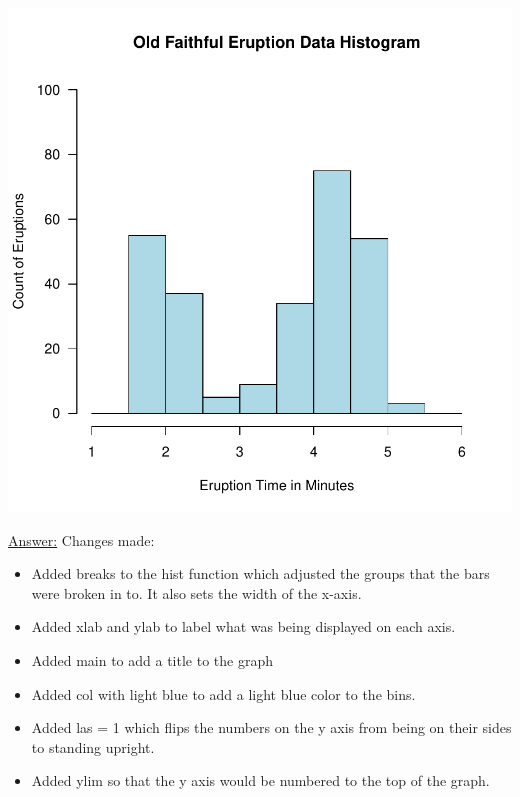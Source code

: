 \documentclass[12pt,letterpaper,final]{article}
\begin{document}
\begin{enumerate}
\begin{enumerate}
\begin{Schunk}
\end{Schunk}
\includegraphics{rnw_example-005}

\underline{Answer:} Changes made:
\begin{itemize}
\item Added breaks to the hist function which adjusted the groups that the bars were broken in to. It also sets the width
of the x-axis.
\item Added xlab and ylab to label what was being displayed on each axis.
\item Added main to add a title to the graph
\item Added col with light blue to add a light blue color to the bins.
\item Added las = 1 which flips the numbers on the y axis from being on their sides to standing upright.
\item Added ylim so that the y axis would be numbered to the top of the graph.
\end{itemize}


\end{enumerate}
\end{enumerate}
\end{document}
